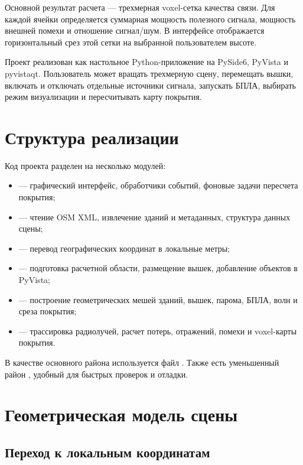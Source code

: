 \documentclass[12pt,a4paper]{article}
\begin{document}
Основной результат расчета --- трехмерная voxel-сетка качества связи. Для каждой ячейки определяется суммарная мощность полезного сигнала, мощность внешней помехи и отношение сигнал/шум. В интерфейсе отображается горизонтальный срез этой сетки на выбранной пользователем высоте.

Проект реализован как настольное Python-приложение на PySide6, PyVista и pyvistaqt. Пользователь может вращать трехмерную сцену, перемещать вышки, включать и отключать отдельные источники сигнала, запускать БПЛА, выбирать режим визуализации и пересчитывать карту покрытия.

\section{Структура реализации}

Код проекта разделен на несколько модулей:

\begin{itemize}
    \item {} --- графический интерфейс, обработчики событий, фоновые задачи пересчета покрытия;
    \item {} --- чтение OSM XML, извлечение зданий и метаданных, структура данных сцены;
    \item {} --- перевод географических координат в локальные метры;
    \item {} --- подготовка расчетной области, размещение вышек, добавление объектов в PyVista;
    \item {} --- построение геометрических мешей зданий, вышек, парома, БПЛА, волн и среза покрытия;
    \item {} --- трассировка радиолучей, расчет потерь, отражений, помехи и voxel-карты покрытия.
\end{itemize}

В качестве основного района используется файл . Также есть уменьшенный район , удобный для быстрых проверок и отладки.

\section{Геометрическая модель сцены}

\subsection{Переход к локальным координатам}
\end{document}
